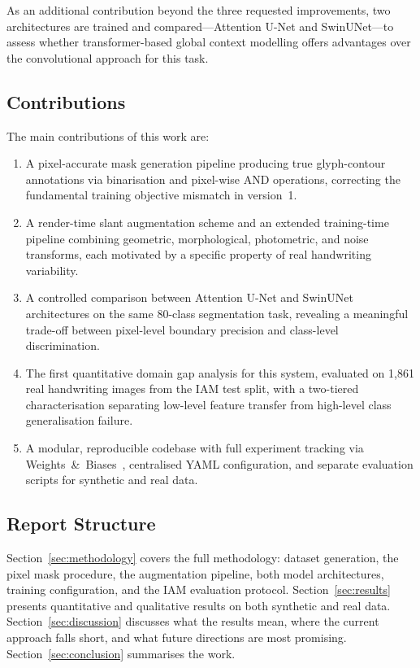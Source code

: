 \documentclass[a4paper,11pt]{article}
\begin{document}
As an additional contribution beyond the three requested improvements, two architectures
are trained and compared---Attention U-Net and SwinUNet---to assess whether
transformer-based global context modelling offers advantages over the convolutional
approach for this task.

\subsection{Contributions}

The main contributions of this work are:

\begin{enumerate}[leftmargin=*, label=(\arabic*)]
    \item A pixel-accurate mask generation pipeline producing true glyph-contour
          annotations via binarisation and pixel-wise AND operations, correcting the
          fundamental training objective mismatch in version~1.
    \item A render-time slant augmentation scheme and an extended training-time pipeline
          combining geometric, morphological, photometric, and noise transforms, each
          motivated by a specific property of real handwriting variability.
    \item A controlled comparison between Attention U-Net and SwinUNet architectures on
          the same 80-class segmentation task, revealing a meaningful trade-off between
          pixel-level boundary precision and class-level discrimination.
    \item The first quantitative domain gap analysis for this system, evaluated on 1,861
          real handwriting images from the IAM test split, with a two-tiered
          characterisation separating low-level feature transfer from high-level class
          generalisation failure.
    \item A modular, reproducible codebase with full experiment tracking via
          Weights~\&~Biases~\cite{wandb2020}, centralised YAML configuration, and separate
          evaluation scripts for synthetic and real data.
\end{enumerate}

\subsection{Report Structure}

Section~\ref{sec:methodology} covers the full methodology: dataset generation, the pixel
mask procedure, the augmentation pipeline, both model architectures, training
configuration, and the IAM evaluation protocol. Section~\ref{sec:results} presents
quantitative and qualitative results on both synthetic and real data.
Section~\ref{sec:discussion} discusses what the results mean, where the current approach
falls short, and what future directions are most promising.
Section~\ref{sec:conclusion} summarises the work.
\end{document}
